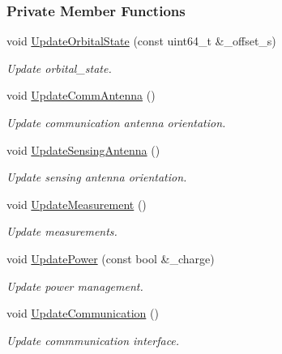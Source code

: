\subsubsection*{Private Member Functions}
\begin{DoxyCompactItemize}
\item 
void \hyperlink{classosse_1_1collaborate_1_1_node_a1f7955a77d53ada38f29b4570b16b3e9}{Update\+Orbital\+State} (const uint64\+\_\+t \&\+\_\+offset\+\_\+s)
\begin{DoxyCompactList}\small\item\em Update orbital\+\_\+state. \end{DoxyCompactList}\item 
\mbox{\label{classosse_1_1collaborate_1_1_node_a2dda0ef1876f0ed936293be997af022a}} 
void \hyperlink{classosse_1_1collaborate_1_1_node_a2dda0ef1876f0ed936293be997af022a}{Update\+Comm\+Antenna} ()
\begin{DoxyCompactList}\small\item\em Update communication antenna orientation. \end{DoxyCompactList}\item 
\mbox{\label{classosse_1_1collaborate_1_1_node_acd5b1c422bbbb309f3c695fac686786f}} 
void \hyperlink{classosse_1_1collaborate_1_1_node_acd5b1c422bbbb309f3c695fac686786f}{Update\+Sensing\+Antenna} ()
\begin{DoxyCompactList}\small\item\em Update sensing antenna orientation. \end{DoxyCompactList}\item 
\mbox{\label{classosse_1_1collaborate_1_1_node_a5c1772b734c6ad8a2892a7304a04a05e}} 
void \hyperlink{classosse_1_1collaborate_1_1_node_a5c1772b734c6ad8a2892a7304a04a05e}{Update\+Measurement} ()
\begin{DoxyCompactList}\small\item\em Update measurements. \end{DoxyCompactList}\item 
void \hyperlink{classosse_1_1collaborate_1_1_node_ac5741490b2b8c184a8825a683ac8c48c}{Update\+Power} (const bool \&\+\_\+charge)
\begin{DoxyCompactList}\small\item\em Update power management. \end{DoxyCompactList}\item 
\mbox{\label{classosse_1_1collaborate_1_1_node_ab8d25ac0c9caeefd987e42104f9e53e4}} 
void \hyperlink{classosse_1_1collaborate_1_1_node_ab8d25ac0c9caeefd987e42104f9e53e4}{Update\+Communication} ()
\begin{DoxyCompactList}\small\item\em Update commmunication interface. \end{DoxyCompactList}\end{DoxyCompactItemize}
